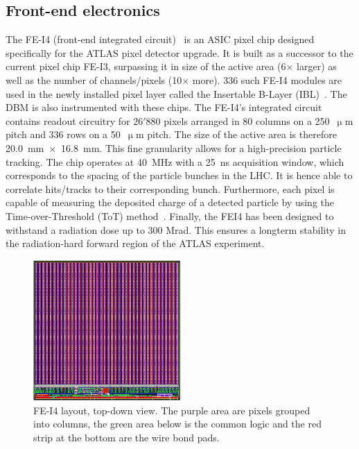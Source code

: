 \subsection{Front-end electronics}
The FE-I4 (front-end integrated circuit)~\cite{Albert:1477014} is an ASIC pixel chip designed specifically for the ATLAS pixel detector upgrade. It is built as a successor to the current pixel chip FE-I3, surpassing it in size of the active area (6$\times$ larger) as well as the number of channels/pixels (10$\times$ more). 336 such FE-I4 modules are used in the newly installed pixel layer called the Insertable B-Layer (IBL)~\cite{Huegging:1314083}. The DBM is also instrumented with these chips. The FE-I4's integrated circuit contains readout circuitry for $26'880$ pixels arranged in 80 columns on a 250~$\upmu$m pitch and 336 rows on a 50~$\upmu$m pitch. The size of the active area is therefore 20.0~mm~$\times$~16.8~mm. This fine granularity allows for a high-precision particle tracking. The chip operates at 40~MHz with a 25~ns acquisition window, which corresponds to the spacing of the particle bunches in the LHC. It is hence able to correlate hits/tracks to their corresponding bunch. Furthermore, each pixel is capable of measuring the deposited charge of a detected particle by using the Time-over-Threshold (ToT) method~\cite{ATLIBL:00001}. Finally, the FEI4 has been designed to withstand a radiation dose up to 300 Mrad. This ensures a longterm stability in the radiation-hard forward region of the ATLAS experiment.

\begin{figure}[!t]
\centering
\includegraphics[width=0.5\textwidth]{04_charge_monitoring/pics/fei41}
\caption{FE-I4 layout, top-down view. The purple area are pixels grouped into columns, the green area below is the common logic and the red strip at the bottom are the wire bond pads.~\cite{Albert:1477014}}
\label{fig:anapix}
\end{figure}

